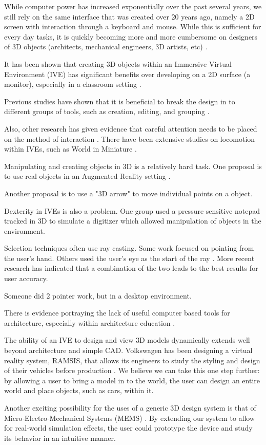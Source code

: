 While computer power has increased exponentially over the past several years, we still rely on the same interface that was created over 20 years ago, namely a 2D screen with interaction through a keyboard and mouse.
While this is sufficient for every day tasks, it is quickly becoming more and more cumbersome on designers of 3D objects (architects, mechanical engineers, 3D artists, etc) \cite{Dekker199242}.

It has been shown that creating 3D objects within an Immersive Virtual Environment (IVE) has significant benefits over developing on a 2D surface (a monitor)\cite{Kaufmann:Usability}, especially in a classroom setting \cite{Kaufmann:LearningGeometry}.

Previous studies have shown that it is beneficial to break the design in to different groups of tools, such as creation, editing, and grouping
\cite{Butterworth:1992:3DM}.

Also, other research has given evidence that careful attention needs to be placed on the method of interaction \cite{Bowman98interactiontechniques}.
There have been extensive studies on locomotion within IVEs, such as World in Miniature \cite{Pausch:WorldInMiniature}.

Manipulating and creating objects in 3D is a relatively hard task\cite{Mine:MovingObjects}.
One proposal is to use real objects in an Augmented Reality setting
\cite{Jota:2011:CVM:1979742.1979915}.

Another proposal is to use a "3D arrow" to move individual points on a object\cite{5759472}.

Dexterity in IVEs is also a problem.
One group used a pressure sensitive notepad tracked in 3D to simulate a digitizer which allowed manipulation of
objects in the environment\cite{658467}.

Selection techniques often use ray casting.  Some work focused on pointing from the user's hand\cite{Mine:MovingObjects}. Others used the user's eye as the start of the ray \cite{Pierce:1997:IPI:253284.253303}.  More recent research has indicated that a combination of the two leads to the best results for user accuracy\cite{5307641}.

Someone did 2 pointer work, but in a desktop environment\cite{Zeleznik:1997:TPI:253284.253316}.

There is evidence portraying the lack of useful computer based tools for architecture, especially within architecture education \cite{Dobson:Architecture}.

The ability of an IVE to design and view 3D models dynamically extends well beyond architecture and simple CAD.
Volkswagen has been designing a virtual reality system, RAMSIS, that allows its engineers to study the styling and design of their vehicles before production \cite{Purschke:Cars}.
We believe we can take this one step further: by allowing a user to bring a model in to the world, the user can design an entire world and place objects, such as cars, within it.

Another exciting possibility for the uses of a generic 3D design system is that of Micro-Electro-Mechanical Systems (MEMS) \cite{Zhao:MEMS}.
By extending our system to allow for real-world simulation effects, the user could prototype the device and study its behavior in an intuitive manner.
